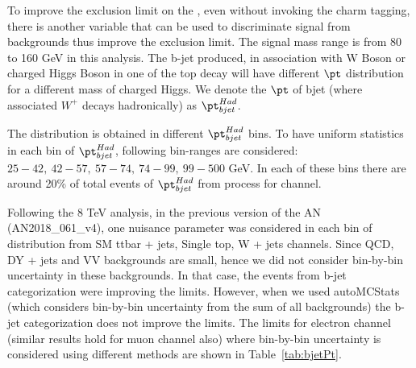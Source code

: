 To improve the exclusion limit on the \brThb, even without invoking the charm tagging, there is another variable that can be used to
    discriminate signal from backgrounds thus improve the exclusion limit. 
    The signal mass range is from 80 to 160 GeV in
    this analysis. The b-jet produced, in association with W Boson or charged Higgs Boson
    in one of the top decay will have different $\pt$ distribution for a different mass 
    of charged Higgs. We denote the $\pt$ of bjet (where associated $W^+$ decays hadronically) 
    as ${\pt}^{Had}_{bjet}$. 
    
    The \mjj distribution is obtained in different ${\pt}_{bjet}^{Had}$ bins. To have 
    uniform statistics in each bin of ${\pt}_{bjet}^{Had}$, following bin-ranges are 
    considered: $25-42, ~42-57, ~57-74, ~74-99, ~99-500$ GeV. In each of these bins there are 
    around 20\% of total events of ${\pt}_{bjet}^{Had}$ from \ttjets process for 
    \mujets channel.

Following the 8 TeV analysis, in the previous version of the AN (AN2018\_061\_v4), one nuisance
parameter was considered in each bin of \mjj distribution from SM ttbar + jets, Single
top, W + jets channels. Since QCD, DY + jets and VV backgrounds are small, hence we did not
consider bin-by-bin uncertainty in these backgrounds. In that case, the events from b-jet \pt categorization were improving the limits. 
However, when we used autoMCStats (which considers bin-by-bin uncertainty from the sum of all
backgrounds) the b-jet \pt categorization does not improve the limits. The limits for electron channel (similar results hold for muon channel also) where bin-by-bin uncertainty is considered using different methods are shown in Table~\ref{tab:bjetPt}.

